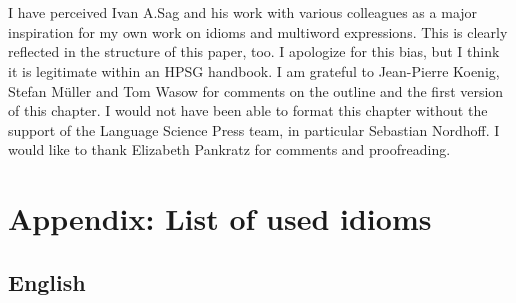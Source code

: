 \documentclass[output=paper,biblatex,babelshorthands,newtxmath,draftmode,colorlinks,citecolor=brown]{langscibook}
\begin{document}
\section*{\acknowledgmentsUS}

I have perceived Ivan A.\@ Sag and his work with various colleagues as a major inspiration for my own work on idioms and multiword expressions. 
This is clearly reflected in the structure of this paper, too. 
I apologize for this bias, but I think it is legitimate within an HPSG handbook.
%
I am grateful to Jean-Pierre Koenig, Stefan Müller and Tom Wasow for comments on the outline and the first version of this chapter. 
%
I would not have been able to format this chapter without the support of the Language Science Press team, in particular Sebastian Nordhoff.
%
I would like to thank Elizabeth Pankratz for comments and proofreading.


\section*{Appendix: List of used idioms}

\subsection*{English}
\end{document}
